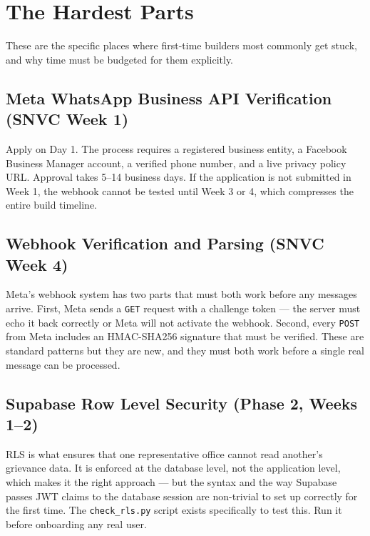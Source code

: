 \documentclass[12pt, a4paper]{article}
\begin{document}
\newpage

\section{The Hardest Parts}

These are the specific places where first-time builders most commonly
get stuck, and why time must be budgeted for them explicitly.

\subsection{Meta WhatsApp Business API Verification (SNVC Week 1)}

Apply on Day 1. The process requires a registered business entity,
a Facebook Business Manager account, a verified phone number, and a
live privacy policy URL. Approval takes 5--14 business days.
If the application is not submitted in Week 1, the webhook cannot be
tested until Week 3 or 4, which compresses the entire build timeline.

\subsection{Webhook Verification and Parsing (SNVC Week 4)}

Meta's webhook system has two parts that must both work before any
messages arrive. First, Meta sends a \texttt{GET} request with a
challenge token --- the server must echo it back correctly or Meta
will not activate the webhook. Second, every \texttt{POST} from Meta
includes an HMAC-SHA256 signature that must be verified. These are
standard patterns but they are new, and they must both work before
a single real message can be processed.

\subsection{Supabase Row Level Security (Phase 2, Weeks 1--2)}

RLS is what ensures that one representative office cannot read another's
grievance data. It is enforced at the database level, not the application
level, which makes it the right approach --- but the syntax and the way
Supabase passes JWT claims to the database session are non-trivial to
set up correctly for the first time. The \texttt{check\_rls.py}
script exists specifically to test this. Run it before onboarding
any real user.
\end{document}
